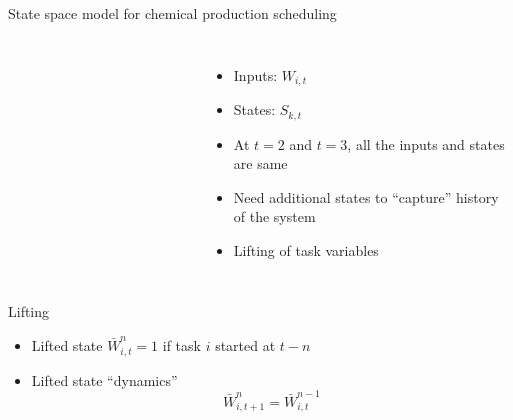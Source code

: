 \documentclass[table]{beamer}
\begin{document}
{
\begin{frame}[t]{State space model for chemical production scheduling}
\begin{columns}[T]
\begin{figure}
  \centering
  \resizebox{0.5\columnwidth}{!}{}
\end{figure}
\begin{figure}
  \centering
  \resizebox{0.8\columnwidth}{!}{}
\end{figure}
\begin{itemize}
\item Inputs: $W_{i,t}$
\item States: $S_{k,t}$
\item At $t=2$ and $t=3$, all the inputs and states are same
\item Need additional states to ``capture'' history of the system
\item \alert{Lifting of task variables}
\end{itemize}
\end{columns}
\end{frame}
}

{
\begin{frame}[t]{Lifting}
\begin{figure}
  \centering
  \resizebox{0.7\columnwidth}{!}{}
\end{figure}
\begin{itemize}
\item Lifted state $\bar{W}_{i,t}^n = 1$ if task $i$ started at $t-n$
\item Lifted state ``dynamics''
\[ \bar{W}_{i,t+1}^n = \bar{W}_{i,t}^{n-1}\]
\end{itemize}
\end{frame}
}
\end{document}
